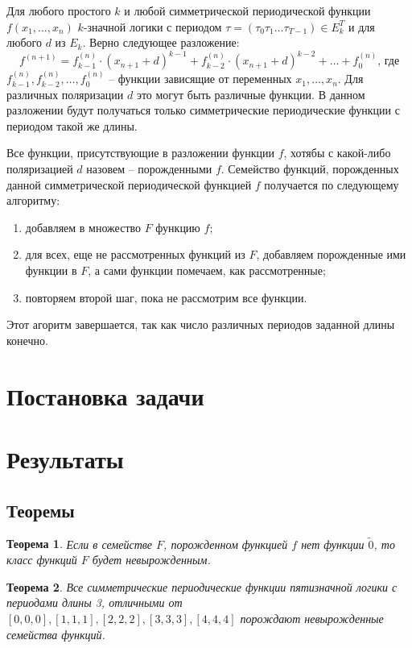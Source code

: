 \documentclass[bibliography=totoc, a4paper, 14pt]{extarticle}
\let\stdsection\section
\renewcommand\section{\newpage\stdsection}
\newtheorem{myth}{Теорема}
\begin{document}
Для любого простого $k$ и любой симметрической периодической функции $f(x_1, \dots, x_n)$ $k$\nobreakdash-значной логики с
периодом $\tau = (\tau_0 \tau_1 \dots \tau_{T-1}) \in E_k^T$ и для любого $d$ из $E_k$. Верно следующее разложение:
$$f^{(n+1)} = f_{k-1}^{(n)}\cdot(x_{n+1}+d)^{k-1} + f_{k-2}^{(n)}\cdot(x_{n+1}+d)^{k-2} + \ldots + f^{(n)}_0\text{, где}$$
$f_{k-1}^{(n)}, f_{k-2}^{(n)}, \ldots, f_0^{(n)}$ -- функции зависящие от переменных $x_1, \ldots, x_n$. Для различных поляризации $d$
это могут быть различные функции.
В данном разложении будут получаться только симметрические периодические функции с периодом такой же длины.

Все функции, присутствующие в разложении функции $f$, хотябы с какой-либо поляризацией $d$ назовем -- порожденными $f$.
Семейство функций, порожденных данной симметрической периодической функцией $f$ получается по следующему алгоритму:
\begin{enumerate}
\item добавляем в множество $F$ функцию $f$;
\item для всех, еще не рассмотренных функций из $F$, добавляем порожденные ими функции в $F$, а сами функции помечаем, как рассмотренные;
\item повторяем второй шаг, пока не рассмотрим все функции.
\end{enumerate}
Этот агоритм завершается, так как число различных периодов заданной длины конечно.

\section{Постановка задачи}

\section{Результаты}
\subsection{Теоремы}
\begin{myth} Если в семействе $F$, порожденном функцией $f$ нет функции $\tilde{0}$, то класс функций $F$ будет невырожденным.
\end{myth}

\begin{myth} Все симметрические периодические функции пятизначной логики с периодами длины 3, отличными от $[0,0,0], [1,1,1],
[2,2,2], [3,3,3], [4,4,4]$ порождают невырожденные семейства функций.
\end{myth}
\end{document}
